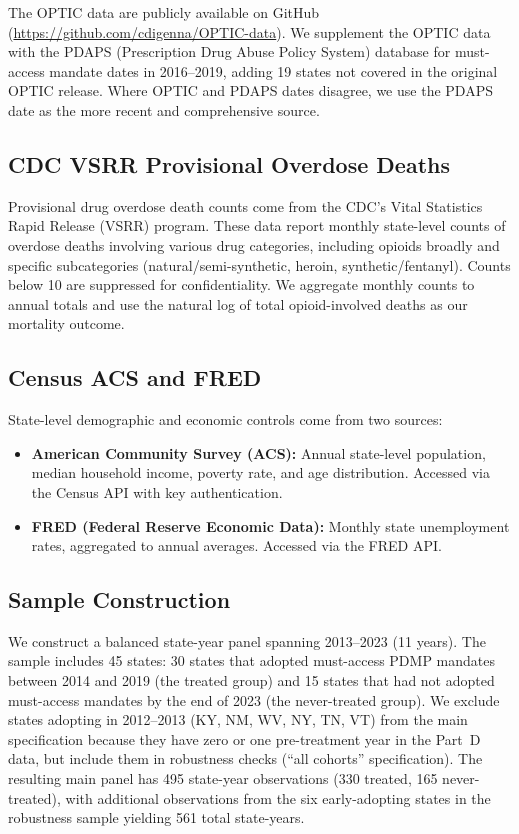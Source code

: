 \documentclass[12pt]{article}
\begin{document}
The OPTIC data are publicly available on GitHub (\url{https://github.com/cdigenna/OPTIC-data}). We supplement the OPTIC data with the PDAPS (Prescription Drug Abuse Policy System) database for must-access mandate dates in 2016--2019, adding 19 states not covered in the original OPTIC release. Where OPTIC and PDAPS dates disagree, we use the PDAPS date as the more recent and comprehensive source.

\subsection{CDC VSRR Provisional Overdose Deaths}

Provisional drug overdose death counts come from the CDC's Vital Statistics Rapid Release (VSRR) program. These data report monthly state-level counts of overdose deaths involving various drug categories, including opioids broadly and specific subcategories (natural/semi-synthetic, heroin, synthetic/fentanyl). Counts below 10 are suppressed for confidentiality. We aggregate monthly counts to annual totals and use the natural log of total opioid-involved deaths as our mortality outcome.

\subsection{Census ACS and FRED}

State-level demographic and economic controls come from two sources:

\begin{itemize}
\item \textbf{American Community Survey (ACS):} Annual state-level population, median household income, poverty rate, and age distribution. Accessed via the Census API with key authentication.
\item \textbf{FRED (Federal Reserve Economic Data):} Monthly state unemployment rates, aggregated to annual averages. Accessed via the FRED API.
\end{itemize}

\subsection{Sample Construction}

We construct a balanced state-year panel spanning 2013--2023 (11 years). The sample includes 45 states: 30 states that adopted must-access PDMP mandates between 2014 and 2019 (the treated group) and 15 states that had not adopted must-access mandates by the end of 2023 (the never-treated group). We exclude states adopting in 2012--2013 (KY, NM, WV, NY, TN, VT) from the main specification because they have zero or one pre-treatment year in the Part~D data, but include them in robustness checks (``all cohorts'' specification). The resulting main panel has 495 state-year observations (330 treated, 165 never-treated), with additional observations from the six early-adopting states in the robustness sample yielding 561 total state-years.
\end{document}

